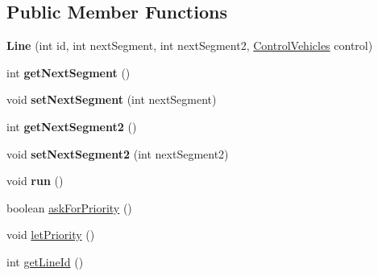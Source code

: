 \subsection*{Public Member Functions}
\begin{DoxyCompactItemize}
\item 
\mbox{\label{classmondragon_1_1edu_1_1clases_1_1_line_a8aad3d798367c561ed9fc859851fe1e4}} 
{\bfseries Line} (int id, int next\+Segment, int next\+Segment2, \mbox{\hyperlink{classmondragon_1_1edu_1_1control_1_1_control_vehicles}{Control\+Vehicles}} control)
\item 
\mbox{\label{classmondragon_1_1edu_1_1clases_1_1_line_a584a701e1605fb3d60fc0167a3b36d9d}} 
int {\bfseries get\+Next\+Segment} ()
\item 
\mbox{\label{classmondragon_1_1edu_1_1clases_1_1_line_a5f1f7acfc559adeae805af4f3238ba4d}} 
void {\bfseries set\+Next\+Segment} (int next\+Segment)
\item 
\mbox{\label{classmondragon_1_1edu_1_1clases_1_1_line_a85f32539820b8fdb7ff4a9c0b3881086}} 
int {\bfseries get\+Next\+Segment2} ()
\item 
\mbox{\label{classmondragon_1_1edu_1_1clases_1_1_line_a5f2fab54c3e948f98962dd6729f05cd0}} 
void {\bfseries set\+Next\+Segment2} (int next\+Segment2)
\item 
\mbox{\label{classmondragon_1_1edu_1_1clases_1_1_line_a24111e28c7a3cd72ab53af6789953b85}} 
void {\bfseries run} ()
\item 
boolean \mbox{\hyperlink{classmondragon_1_1edu_1_1clases_1_1_line_ae7dd6411b698a9aee850cc556c549128}{ask\+For\+Priority}} ()
\item 
void \mbox{\hyperlink{classmondragon_1_1edu_1_1clases_1_1_line_a43a8aebb98a2d62a09c3bcb08f7dc553}{let\+Priority}} ()
\item 
int \mbox{\hyperlink{classmondragon_1_1edu_1_1clases_1_1_line_ad7b2b31ddbd98c9dce53a6eb792b61ba}{get\+Line\+Id}} ()
\end{DoxyCompactItemize}
